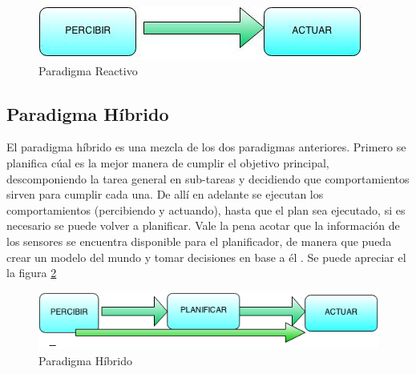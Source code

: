 \begin{figure}[hbtp]

\centering
\includegraphics[scale=0.7]{imagenes/reactivo.jpg} 
\caption{Paradigma Reactivo}
\label{fig:reactivo}
\end{figure}


\subsection{Paradigma Híbrido}
El paradigma híbrido es una mezcla de los dos paradigmas anteriores. Primero se planifica cúal es la mejor manera de cumplir el objetivo principal, descomponiendo la tarea general en sub-tareas y decidiendo que comportamientos sirven para cumplir cada una. De allí en adelante se ejecutan los comportamientos (percibiendo y actuando), hasta que el plan sea ejecutado, si es necesario se puede volver a planificar. Vale la pena acotar que la información de los sensores se encuentra disponible para el planificador, de manera que pueda crear un modelo del mundo y tomar decisiones en base a él  \cite{AiRobotics}. 
Se puede apreciar el la figura \ref{fig:hibrido}
\begin{figure}[hbtp]

\centering
\includegraphics[scale=0.7]{imagenes/hibrido.png} 
\caption{Paradigma H\'ibrido}
\label{fig:hibrido}
\end{figure}

